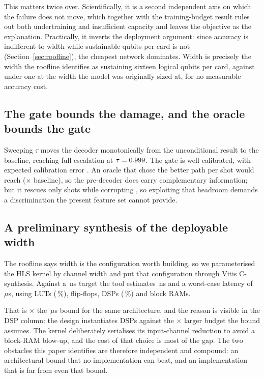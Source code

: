 \documentclass[pdflatex,sn-mathphys-num]{sn-jnl}
\begin{document}
This matters twice over. Scientifically, it is a second independent axis on
which the failure does not move, which together with the training-budget result
rules out both undertraining and insufficient capacity and leaves the objective
as the explanation. Practically, it inverts the deployment argument: since
accuracy is indifferent to width while sustainable qubits per card is not
(Section~\ref{sec:roofline}), the cheapest network dominates. Width
\widthSweepMin{} is precisely the width the roofline identifies as sustaining
sixteen logical qubits per card, against under one at the width the model was
originally sized at, for no measurable accuracy cost.

\subsection{The gate bounds the damage, and the oracle bounds the gate}

Sweeping $\tau$ moves the decoder monotonically from the unconditional result to
the baseline, reaching full escalation at $\tau = 0.999$. The
gate is well calibrated, with expected calibration error \hierECE. An oracle that
chose the better path per shot would reach \hierOracleLER{}
(\hierOracleRatio$\times$ baseline), so the pre-decoder does carry complementary
information; but it rescues only \hierSaves{} shots while corrupting
\hierBreaks, so exploiting that headroom demands a discrimination the present
feature set cannot provide.

\subsection{A preliminary synthesis of the deployable width}\label{sec:hls}

The roofline says width \widthForQubitsSixteen{} is the configuration worth
building, so we parameterised the HLS kernel by channel width and put that
configuration through Vitis C-synthesis. Against a \hlsClockTarget\,ns target
the tool estimates \hlsClockEstimated\,ns and a worst-case latency of
\hlsLatencyUs\,$\mu$s, using \hlsLUT{} LUTs (\hlsLUTpct\,\%), \hlsFF{} flip-flops,
\hlsDSP{} DSPs (\hlsDSPpct\,\%) and \hlsBRAM{} block RAMs.

That is \hlsGap$\times$ the \hlsRooflineUs\,$\mu$s bound for the same
architecture, and the reason is visible in the DSP column: the design
instantiates \hlsDSP{} DSPs against the \hlsDSPShortfall$\times$ larger budget
the bound assumes. The kernel deliberately serialises its input-channel
reduction to avoid a block-RAM blow-up, and the cost of that choice is most of
the gap. The two obstacles this paper identifies are therefore independent and
compound: an architectural bound that no implementation can beat, and an
implementation that is far from even that bound.
\end{document}
